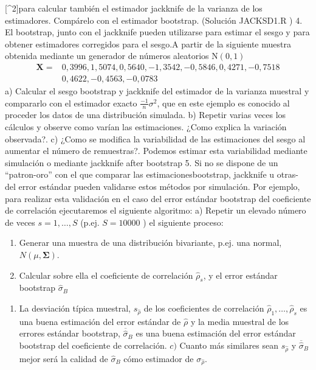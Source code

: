 \documentclass[
]{article}
\providecommand{\tightlist}{%
  \setlength{\itemsep}{0pt}\setlength{\parskip}{0pt}}
\begin{document}
{[}\^{}2{]}para calcular también el estimador jackknife de la varianza de los estimadores. Compárelo con el estimador bootstrap. (Solución JACKSD1.R )
4. El bootstrap, junto con el jackknife pueden utilizarse para estimar el sesgo y para obtener estimadores corregidos para el sesgo.A partir de la siguiente muestra obtenida mediante un generador de números aleatorios \(\mathrm{N}(0,1)\)
\[
\begin{aligned}
\mathbf{X}= & 0,3996,1,5074,0,5640,-1,3542,-0,5846,0,4271,-0,7518 \\
& 0,4622,-0,4563,-0,0783
\end{aligned}
\]
a) Calcular el sesgo bootstrap y jackknife del estimador de la varianza muestral y compararlo con el estimador exacto \(\frac{-1}{n} \sigma^{2}\), que en este ejemplo es conocido al proceder los datos de una distribución simulada.
b) Repetir varias veces los cálculos y observe como varían las estimaciones. ¿Como explica la variación observada?.
c) ¿Como se modifica la variabilidad de las estimaciones del sesgo al aumentar el número de remuestras?. Podemos estimar esta variabilidad mediante simulación o mediante jackknife after bootstrap
5. Si no se dispone de un ``patron-oro'' con el que comparar las estimacionesbootstrap, jackknife u otras- del error estándar pueden validarse estos métodos por simulación. Por ejemplo, para realizar esta validación en el caso del error estándar bootstrap del coeficiente de correlación ejecutaremos el siguiente algoritmo:
a) Repetir un elevado número de veces \(s=1, \ldots, S\) (p.ej. \(S=10000\) ) el siguiente proceso:

\begin{enumerate}
\def\labelenumi{\arabic{enumi})}
\tightlist
\item
  Generar una muestra de una distribución bivariante, p.ej. una normal, \(N(\mu, \boldsymbol{\Sigma})\).
\item
  Calcular sobre ella el coeficiente de correlación \(\hat{\rho}_{s}\), y el error estándar bootstrap \(\hat{\sigma}_{B}\)
\end{enumerate}

\begin{enumerate}
\def\labelenumi{\alph{enumi})}
\setcounter{enumi}{1}
\tightlist
\item
  La desviación típica muestral, \(s_{\hat{\rho}}\) de los coeficientes de correlación \(\hat{\rho}_{1}, \ldots, \hat{\rho}_{s}\) es una buena estimación del error estándar de \(\hat{\rho}\) y la media muestral de los errores estándar bootstrap, \(\overline{\hat{\sigma}}_{B}\) es una buena estimación del error estándar bootstrap del coeficiente de correlación.
  \(c)\) Cuanto más similares sean \(s_{\hat{\rho}}\) y \(\overline{\hat{\sigma}}_{B}\) mejor será la calidad de \(\hat{\sigma}_{B}\) cómo estimador de \(\sigma_{\hat{\rho}}\).
\end{enumerate}
\end{document}
